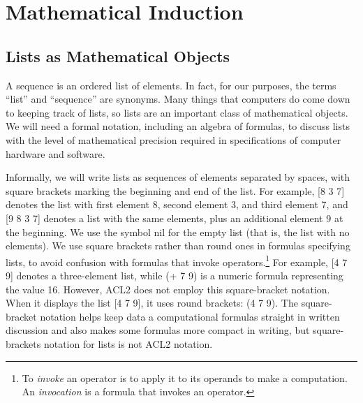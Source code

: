 \chapter{Mathematical Induction}
\label{ch:mathematical-induction}

\section{Lists as Mathematical Objects}
\label{sec:lists-as-obj}
A sequence
is an ordered list of elements.
In fact, for our purposes, the terms ``list'' and ``sequence'' are synonyms.
Many things that computers do come down to keeping track of lists,
so lists are an important class of mathematical objects.
We will need a formal notation, including an algebra of formulas,
to discuss lists with the level of mathematical precision
required in specifications of computer hardware and software.

Informally, we will write lists as sequences of elements separated by spaces,
with square brackets marking the beginning and end of the list.
For example, \textsf{[8 3 7]} denotes the list with first element 8,
second element 3, and third element 7, and
\textsf{[9 8 3 7]} denotes a list with the same elements,
plus an additional element 9 at the beginning.
\label{nil-def}
We use the symbol \textsf{nil} for the empty list
(that is, the list with no elements).
\label{square-brackets}We use
square brackets
rather than round ones in formulas
specifying lists, to avoid confusion with formulas that
invoke operators.\footnote{To \emph{invoke}
an operator is to apply it to its operands
to make a computation.
An \emph{invocation} is a formula that invokes an operator.}
For example, \textsf{[4 7 9]} denotes a three-element list,
while \textsf{(+ 7 9)} is a numeric formula representing the value 16.
However, ACL2 does not employ this square-bracket notation.
When it displays the list \textsf{[4 7 9]},
it uses round brackets: \textsf{(4 7 9)}.
The square-bracket notation helps keep data a computational formulas
straight in written discussion and also makes some
formulas more compact in writing, but square-brackets
notation for lists is not ACL2 notation.

